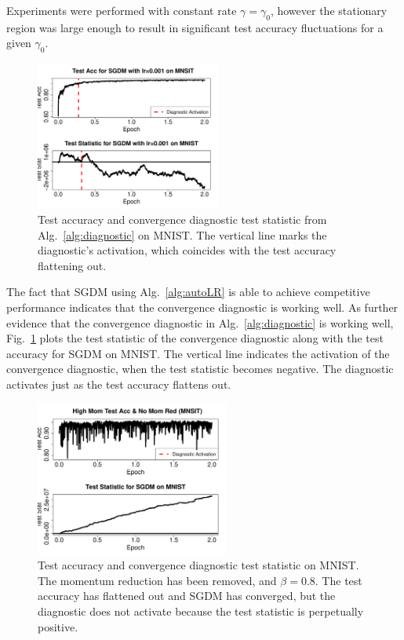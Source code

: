 \documentclass[conference]{IEEEtran}
\begin{document}
Experiments were performed with constant rate $\gamma = \gamma_0$, however the stationary region was large enough to result in significant test accuracy fluctuations for a given $\gamma_0$.

\begin{figure}[b]
\vspace{-0.15in}
\begin{center}
\includegraphics[width=2.4in]{fig/RFig3_Stat.pdf}
\end{center}
\vspace{-0.15in}
  \caption{Test accuracy and convergence diagnostic test statistic from Alg.~\ref{alg:diagnostic} on MNIST. 
  The vertical line marks the diagnostic's activation, which coincides with the test accuracy flattening out.
  }
\label{fig:mnist_teststat}%
\end{figure}

The fact that SGDM using Alg.~\ref{alg:autoLR} is able to achieve competitive performance indicates that the convergence diagnostic is working well. 
As further evidence that the convergence diagnostic in Alg.~\ref{alg:diagnostic} is working well, Fig.~\ref{fig:mnist_teststat} plots the test statistic of the convergence diagnostic along with the test accuracy for SGDM on MNIST.
The vertical line indicates the activation of the convergence diagnostic, when the test statistic becomes negative. 
The diagnostic activates just as the test accuracy flattens out.

\begin{figure}[h]
\begin{center}
  \includegraphics[width=2.5in]{fig/RFig6_ablation.pdf}\hspace{-0.12in}
\end{center}
\vspace{-0.15in}
  \caption{Test accuracy and convergence diagnostic test statistic on MNIST. The momentum reduction has been removed, and $\beta = 0.8$. The test accuracy has flattened out and SGDM has converged, but the diagnostic does not activate because the test statistic is perpetually positive.
  }
\label{fig:mnist_ablation}
\end{figure}
\end{document}
